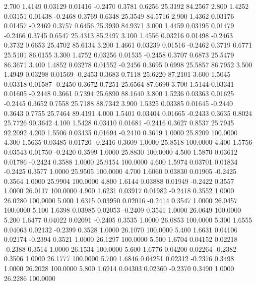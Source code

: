    2.700   1.4149   0.03129   0.01416  -0.2470   0.3781   0.6256  25.3192  84.2567
   2.800   1.4252   0.03151   0.01438  -0.2468   0.3769   0.6348  25.3549  84.5716
   2.900   1.4362   0.03176   0.01457  -0.2469   0.3757   0.6456  25.3930  84.9371
   3.000   1.4459   0.03195   0.01479  -0.2466   0.3745   0.6547  25.4313  85.2497
   3.100   1.4556   0.03216   0.01498  -0.2463   0.3732   0.6653  25.4702  85.6134
   3.200   1.4661   0.03239   0.01516  -0.2462   0.3719   0.6771  25.5101  86.0155
   3.300   1.4752   0.03256   0.01535  -0.2458   0.3707   0.6873  25.5479  86.3671
   3.400   1.4852   0.03278   0.01552  -0.2456   0.3695   0.6998  25.5857  86.7952
   3.500   1.4949   0.03298   0.01569  -0.2453   0.3683   0.7118  25.6220  87.2101
   3.600   1.5045   0.03318   0.01587  -0.2450   0.3672   0.7251  25.6564  87.6690
   3.700   1.5144   0.03341   0.01605  -0.2448   0.3661   0.7394  25.6890  88.1640
   3.800   1.5236   0.03363   0.01625  -0.2445   0.3652   0.7558  25.7188  88.7342
   3.900   1.5325   0.03385   0.01645  -0.2440   0.3643   0.7755  25.7464  89.4191
   4.000   1.5401   0.03404   0.01665  -0.2433   0.3635   0.8024  25.7726  90.3642
   4.100   1.5428   0.03410   0.01681  -0.2416   0.3627   0.8537  25.7945  92.2092
   4.200   1.5506   0.03435   0.01694  -0.2410   0.3619   1.0000  25.8209 100.0000
   4.300   1.5635   0.03485   0.01720  -0.2416   0.3609   1.0000  25.8518 100.0000
   4.400   1.5756   0.03543   0.01750  -0.2420   0.3599   1.0000  25.8830 100.0000
   4.500   1.5870   0.03612   0.01786  -0.2424   0.3588   1.0000  25.9154 100.0000
   4.600   1.5974   0.03701   0.01834  -0.2425   0.3577   1.0000  25.9505 100.0000
   4.700   1.6060   0.03830   0.01905  -0.2425   0.3564   1.0000  25.9904 100.0000
   4.800   1.6144   0.03888   0.01949  -0.2422   0.3557   1.0000  26.0117 100.0000
   4.900   1.6231   0.03917   0.01982  -0.2418   0.3552   1.0000  26.0280 100.0000
   5.000   1.6315   0.03950   0.02016  -0.2414   0.3547   1.0000  26.0457 100.0000
   5.100   1.6398   0.03985   0.02053  -0.2409   0.3541   1.0000  26.0649 100.0000
   5.200   1.6477   0.04022   0.02091  -0.2405   0.3535   1.0000  26.0853 100.0000
   5.300   1.6555   0.04063   0.02132  -0.2399   0.3528   1.0000  26.1070 100.0000
   5.400   1.6631   0.04106   0.02174  -0.2394   0.3521   1.0000  26.1297 100.0000
   5.500   1.6704   0.04152   0.02218  -0.2388   0.3514   1.0000  26.1534 100.0000
   5.600   1.6776   0.04200   0.02264  -0.2382   0.3506   1.0000  26.1777 100.0000
   5.700   1.6846   0.04251   0.02312  -0.2376   0.3498   1.0000  26.2028 100.0000
   5.800   1.6914   0.04303   0.02360  -0.2370   0.3490   1.0000  26.2286 100.0000

